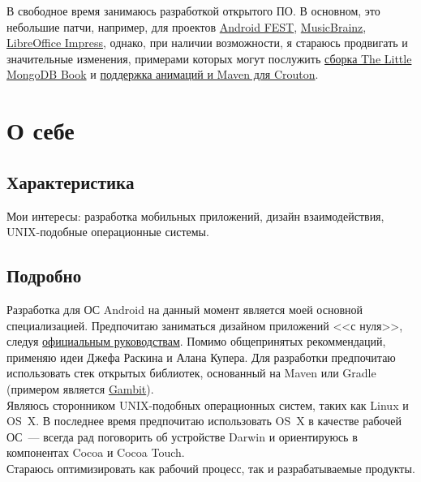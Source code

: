       В свободное время занимаюсь разработкой открытого ПО.
      В основном, это небольшие патчи, например, для проектов
      \href{https://github.com/square/fest-android/commits?author=ming13}{Android FEST},
      \href{https://github.com/jdamcd/musicbrainz-android/commits?author=ming13}{MusicBrainz},
      \href{https://gerrit.libreoffice.org/#/q/owner:%22Artur+Dryomov%22+status:closed,n,z}{LibreOffice Impress},
      однако, при наличии возможности, я стараюсь продвигать и значительные изменения, примерами
      которых могут послужить
      \href{https://github.com/karlseguin/the-little-mongodb-book/pull/16}{сборка The Little MongoDB Book} и
      \href{https://github.com/keyboardsurfer/Crouton/pulls/ming13?state=closed}{поддержка анимаций и Maven для Crouton}.


  \section*{О себе}

    \subsection*{Характеристика}

      Мои интересы: разработка мобильных приложений, дизайн
      взаимодействия, UNIX-подобные операционные системы.

    \subsection*{Подробно}

      Разработка для ОС Android на данный момент является моей основной специализацией.
      Предпочитаю заниматься дизайном приложений <<с нуля>>, следуя
      \href{https://developer.android.com/design/}{официальным руководствам}.
      Помимо общепринятых рекоммендаций, применяю идеи Джефа Раскина
      и Алана Купера. Для разработки предпочитаю использовать стек
      открытых библиотек, основанный на Maven или Gradle (примером является
      \href{https://github.com/ming13/gambit}{Gambit}). \\

      Являюсь сторонником UNIX-подобных операционных систем,
      таких как Linux и OS~X. В последнее время предпочитаю использовать
      OS~X в качестве рабочей ОС~--- всегда рад поговорить об устройстве Darwin
      и ориентируюсь в компонентах Cocoa и Cocoa Touch. \\

      Стараюсь оптимизировать как рабочий процесс,
      так и разрабатываемые продукты. \\

  \vfill


